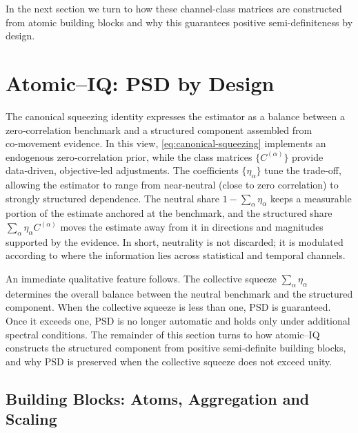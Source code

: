 \documentclass[12pt,letterpaper]{article}
\begin{document}
In the next section we turn to how these channel-class matrices are constructed from atomic building blocks and why this guarantees positive semi-definiteness by design.

\section{Atomic--IQ: PSD by Design}

The canonical squeezing identity expresses the estimator as a balance between a zero‑correlation benchmark and a structured component assembled from co‑movement evidence. In this view, \eqref{eq:canonical-squeezing} implements an endogenous zero‑correlation prior, while the class matrices $\{C^{(\alpha)}\}$ provide data‑driven, objective-led adjustments. The coefficients $\{\eta_\alpha\}$ tune the trade‑off, allowing the estimator to range from near‑neutral (close to zero correlation) to strongly structured dependence. The neutral share $1-\sum_\alpha \eta_\alpha$ keeps a measurable portion of the estimate anchored at the benchmark, and the structured share $\sum_\alpha \eta_\alpha C^{(\alpha)}$ moves the estimate away from it in directions and magnitudes supported by the evidence. In short, neutrality is not discarded; it is modulated according to where the information lies across statistical and temporal channels.

An immediate qualitative feature follows. The collective squeeze $\sum_\alpha \eta_\alpha$ determines the overall balance between the neutral benchmark and the structured component. When the collective squeeze is less than one, PSD is guaranteed. Once it exceeds one, PSD is no longer automatic and holds only under additional spectral conditions. The remainder of this section turns to how atomic–IQ constructs the structured component from positive semi‑definite building blocks, and why PSD is preserved when the collective squeeze does not exceed unity.

\subsection{Building Blocks: Atoms, Aggregation and Scaling}
\end{document}
